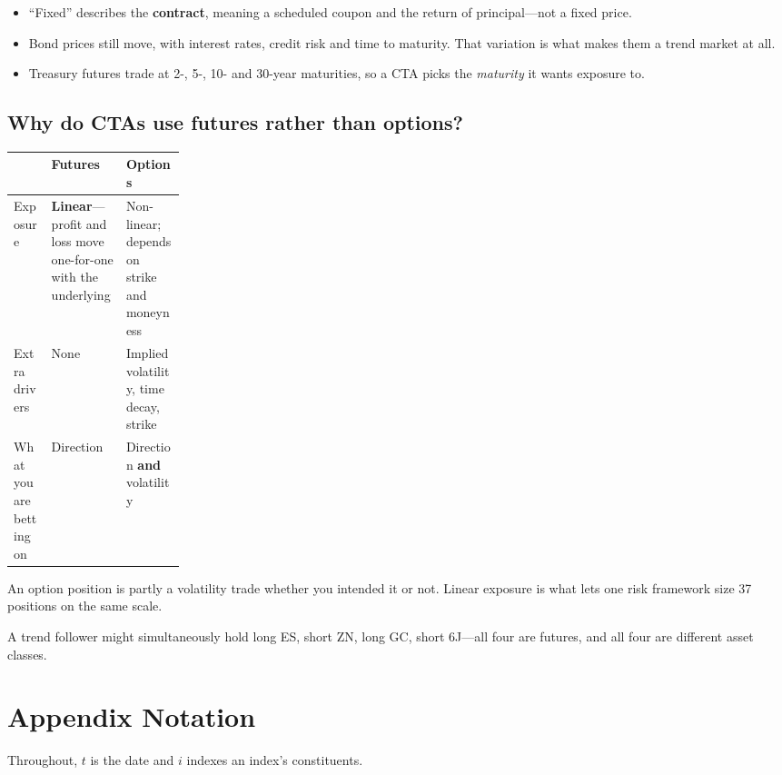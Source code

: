 \begin{itemize}
  \item ``Fixed'' describes the \textbf{contract}, meaning a scheduled coupon and the return of
        principal---not a fixed price.
  \item Bond prices still move, with interest rates, credit risk and time to maturity. That
        variation is what makes them a trend market at all.
  \item Treasury futures trade at 2-, 5-, 10- and 30-year maturities, so a CTA picks the
        \emph{maturity} it wants exposure to.
\end{itemize}

\subsection*{Why do CTAs use futures rather than options?}

\begin{tabularx}{\linewidth}{|>{\raggedright\arraybackslash}p{0.22\linewidth}|X|X|}
\hline
 & \textbf{Futures} & \textbf{Options} \\ \hline
Exposure
  & \textbf{Linear}---profit and loss move one-for-one with the underlying
  & Non-linear; depends on strike and moneyness \\ \hline
Extra drivers & None & Implied volatility, time decay, strike \\ \hline
What you are betting on & Direction & Direction \textbf{and} volatility \\ \hline
\end{tabularx}

An option position is partly a volatility trade whether you intended it or not. Linear exposure is
what lets one risk framework size 37 positions on the same scale.

\begin{example}\label{ex:four-legs}
A trend follower might simultaneously hold long ES, short ZN, long GC, short 6J---all four are
futures, and all four are different asset classes.
\end{example}


\section*{Appendix \midot{} Notation}

Throughout, $t$ is the date and $i$ indexes an index's constituents.

